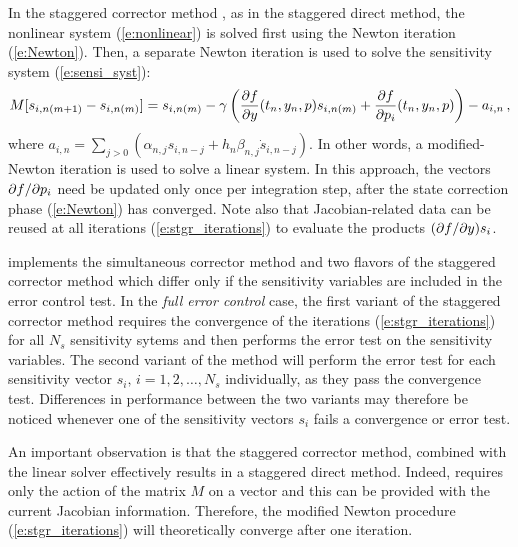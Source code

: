\begin{itemize}
  In the staggered corrector method \cite{FTB97}, as in the staggered direct method,
  the nonlinear system (\ref{e:nonlinear}) is solved first using the Newton iteration
  (\ref{e:Newton}). Then, a separate Newton iteration is used to solve the
  sensitivity system (\ref{e:sensi_syst}):
  \begin{equation}\label{e:stgr_iterations}
    M [s_{i , n(m+1)} - s_{i , n(m)}]=
    s_{i, n(m)} - 
    \gamma \left( \frac{\partial f}{\partial y} (t_n , y_n, p) s_{i , n(m)} + \frac{\partial f}{\partial p_i} (t_n , y_n , p) \right)
    -a_{i,n} \, ,
  \end{equation}
  where $a_{i,n} = \sum_{j>0}(\alpha_{n,j}s_{i , n-j}+h_n\beta_{n,j}\dot{s}_{i , n-j})$.
  In other words, a modified-Newton iteration is used to solve a linear system.
  In this approach, the vectors $\partial f / \partial p_i$ need be updated only once per integration step, 
  after the state correction phase (\ref{e:Newton}) has converged. Note also that 
  Jacobian-related data can be reused at all iterations (\ref{e:stgr_iterations})
  to evaluate the products $(\partial f / \partial y) s_i$.
  
\end{itemize}

{\cvodes} implements the simultaneous corrector method and two flavors of the 
staggered corrector method which differ only if the sensitivity variables are
included in the error control test.  
In the {\em full error control} case, 
the first variant of the staggered corrector method requires the convergence of 
the iterations (\ref{e:stgr_iterations}) for all $N_s$ sensitivity sytems and then 
performs the error test on the sensitivity variables. The second variant of the method
will perform the error test for each sensitivity vector $s_i,\,i=1,2,\ldots,N_s$
individually, as they pass the convergence test. Differences in performance
between the two variants may therefore be noticed whenever one of the sensitivity 
vectors $s_i$ fails a convergence or error test. 

An important observation is that the staggered corrector method, combined with 
the {\spgmr} linear solver effectively results in a staggered direct method. 
Indeed, {\spgmr} requires only the action of the matrix $M$ on a vector and
this can be provided with the current Jacobian information. Therefore, the
modified Newton procedure (\ref{e:stgr_iterations}) will theoretically converge 
after one iteration.


